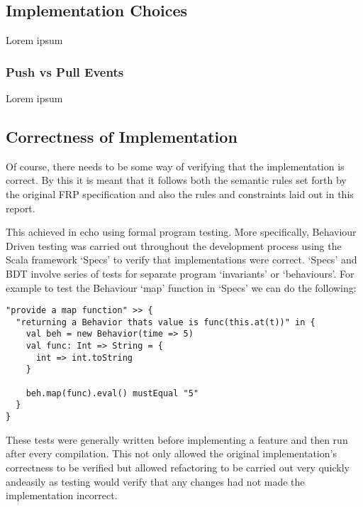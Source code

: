 \documentclass[12pt]{article}
\begin{document}
      
    \subsection{Implementation Choices}
      Lorem ipsum
      
      \subsubsection{Push vs Pull Events}
        Lorem ipsum
        
    
    \subsection{Correctness of Implementation}
      Of course, there needs to be some way of verifying that the implementation is correct. By
      this it is meant that it follows both the semantic rules set forth by the original FRP specification
      and also the rules and constraints laid out in this report.
      
      This achieved in echo using formal program testing. More specifically, Behaviour Driven
      testing was carried out throughout the development process using the Scala framework `Specs'
      to verify that implementations were correct. `Specs' and BDT involve series of tests for
      separate program `invariants' or `behaviours'. For example to test the Behaviour `map' function
      in `Specs' we can do the following:
 
\begin{verbatim}
"provide a map function" >> {
  "returning a Behavior thats value is func(this.at(t))" in {
    val beh = new Behavior(time => 5)
    val func: Int => String = {
      int => int.toString
    }

    beh.map(func).eval() mustEqual "5"
  }
}
\end{verbatim}      

    These tests were generally written before implementing a feature and then run after every compilation. 
    This not only allowed the original implementation's correctness to be verified but
    allowed refactoring to be carried out very quickly andeasily as testing would verify that any changes had not
    made the implementation incorrect.
      
\end{document}
